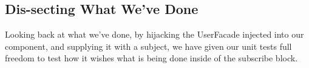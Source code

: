\subsection{Dis-secting What We've Done}
Looking back at what we've done, by hijacking the UserFacade injected into our
component, and supplying it with a subject, we have given our unit tests full
freedom to test how it wishes what is being done inside of the subscribe block.

